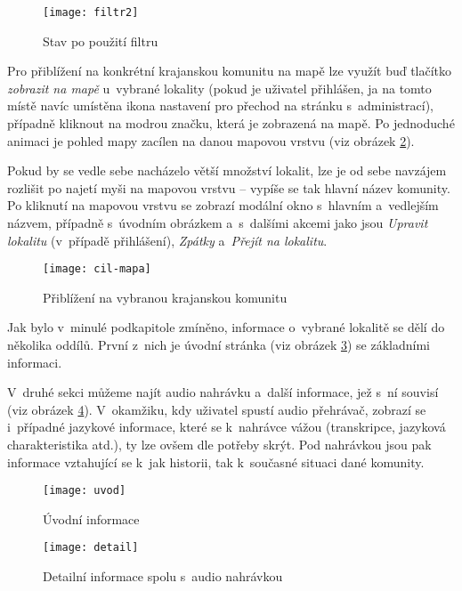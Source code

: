 \begin{figure}  
    \centering
    \texttt{[image: filtr2]}  
    \caption{Stav po použití filtru}
    \label{filtr2}
\end{figure}

Pro přiblížení na konkrétní krajanskou komunitu na mapě lze využít buď tlačítko \emph{zobrazit na mapě} u~vybrané lokality (pokud je uživatel přihlášen, ja na tomto místě navíc umístěna ikona nastavení pro přechod na stránku s~administrací), případně kliknout na modrou značku, která je zobrazená na mapě. Po jednoduché animaci je pohled mapy zacílen na danou mapovou vrstvu (viz obrázek \ref{cil-mapa}).

Pokud by se vedle sebe nacházelo větší množství lokalit, lze je od sebe navzájem rozlišit po najetí myši na mapovou vrstvu -- vypíše se tak hlavní název komunity. Po kliknutí na mapovou vrstvu se zobrazí modální okno s~hlavním a~vedlejším názvem, případně s~úvodním obrázkem a~s~dalšími akcemi jako jsou \emph{Upravit lokalitu} (v~případě přihlášení), \emph{Zpátky} a~\emph{Přejít na lokalitu}.

\begin{figure} 
    \centering
    \texttt{[image: cil-mapa]}  
    \caption{Přiblížení na vybranou krajanskou komunitu}
    \label{cil-mapa}
\end{figure}

Jak bylo v~minulé podkapitole zmíněno, informace o~vybrané lokalitě se dělí do několika oddílů. První z~nich je úvodní stránka (viz obrázek \ref{uvod}) se základními informaci.

V~druhé sekci můžeme najít audio nahrávku a~další informace, jež s~ní souvisí (viz obrázek \ref{detail}). V~okamžiku, kdy uživatel spustí audio přehrávač, zobrazí se i~případné jazykové informace, které se k~nahrávce vážou (transkripce, jazyková charakteristika atd.), ty lze ovšem dle potřeby skrýt. Pod nahrávkou jsou pak informace vztahující se k~jak historii, tak k~současné situaci dané komunity.

\begin{figure} 
    \centering
    \texttt{[image: uvod]}  
    \caption{Úvodní informace}
    \label{uvod}
\end{figure}

\begin{figure}
    \centering
    \texttt{[image: detail]}  
    \caption{Detailní informace spolu s~audio nahrávkou}
    \label{detail}
\end{figure}

